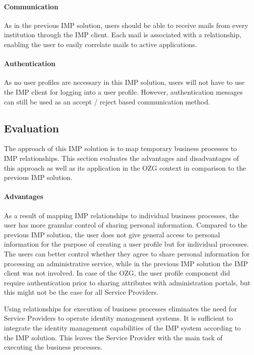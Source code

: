 \paragraph{Communication}

As in the previous IMP solution, users should be able to receive mails from every institution through the IMP client. Each mail is associated with a relationship, enabling the user to easily correlate mails to active applications.

\paragraph{Authentication}

As no user profiles are necessary in this IMP solution, users will not have to use the IMP client for logging into a user profile. However, authentication messages can still be used as an accept / reject based communication method.

\subsection{Evaluation}
The approach of this IMP solution is to map temporary business processes to IMP relationships. This section evaluates the advantages and disadvantages of this approach as well as its application in the OZG context in comparison to the previous IMP solution.

\paragraph{Advantages}

As a result of mapping IMP relationships to individual business processes, the user has more granular control of sharing personal information. Compared to the previous IMP solution, the user does not give general access to personal information for the purpose of creating a user profile but for individual processes. The users can better control whether they agree to share personal information for processing an administrative service, while in the previous IMP solution the IMP client was not involved. In case of the OZG, the user profile component did require authentication prior to sharing attributes with administration portals, but this might not be the case for all Service Providers.

Using relationships for execution of business processes eliminates the need for Service Providers to operate identity management systems. It is sufficient to integrate the identity management capabilities of the IMP system according to the IMP solution. This leaves the Service Provider with the main task of executing the business processes. 

